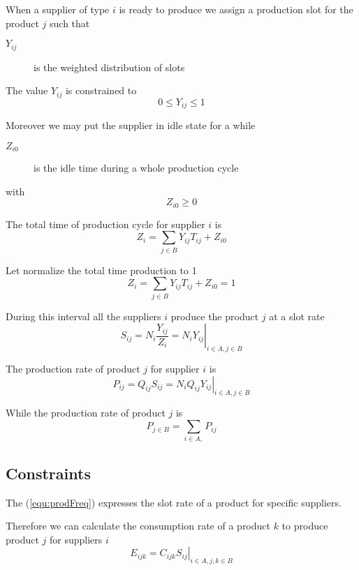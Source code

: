 \documentclass[a4paper,11pt]{article}
\begin{document}
When a supplier of type $ i $ is ready to produce we assign a production slot for the product $ j $ such that
\begin{description}
	\item[ $ Y_{ij} $ ] is the weighted distribution of slots
\end{description}

The value $ Y_{ij} $ is constrained to 
\begin{equation}
\label{equ:YConstraints}
	0 \le Y_{ij} \le 1
\end{equation}

Moreover we may put the supplier in idle state for a while
\begin{description}
	\item[$ Z_{i0} $]
		is the idle time during a whole production cycle
\end{description}
with
\begin{equation}
\label{equ:ZConstraints}
	Z_{i0} \ge 0
\end{equation}


The total time of production cycle for supplier $ i $ is
	\[ Z_i = \sum_{j \in B} Y_{ij} T_{ij} + Z_{i0} \]

Let normalize the total time production to 1
\begin{equation}
\label{equ:normalInterval}
	Z_i = \sum_{j \in B} Y_{ij} T_{ij} + Z_{i0} = 1
\end{equation}

During this interval all the suppliers $ i $ produce the product $ j $ at a slot rate
\begin{equation}
\label{equ:prodFreq}
\left.
	S_{ij} =  N_i \frac{Y_{ij}}{Z_i} = N_i Y_{ij}
\right| _{i \in A, j \in B}
\end{equation}

The production rate of product $ j $ for supplier $ i $ is
\[
\left.
	P_{ij} =  Q_{ij} S_{ij} = N_i Q_{ij} Y_{ij}
\right| _{i \in A, j \in B}
\]

While the production rate of product $ j $ is
	\[ P_{j \in B} = \sum_{i \in A,} P_{ij} \]

\subsection{Constraints}

The (\ref{equ:prodFreq}) expresses the slot rate of a product for specific suppliers.

Therefore we can calculate the consumption rate of a product $k$ to produce product $ j $ for suppliers $ i $
\[
\left.
	E_{ijk}  = C_{ijk} S_{ij}
\right| _{i \in A, j,k \in B}
\]
\end{document}
